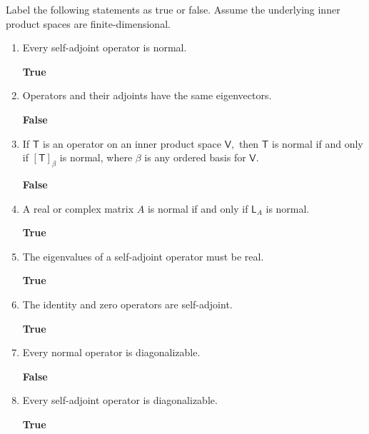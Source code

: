 Label the following statements as true or false. Assume the underlying
inner product spaces are finite-dimensional.
\begin{enumerate}
\item Every self-adjoint operator is normal.

{\bf True}

\item Operators and their adjoints have the same eigenvectors.

{\bf False}

\item If $\mathsf{T}$ is an operator on an inner product space
  $\mathsf{V},$ then $\mathsf{T}$ is normal if and only if
  $[\mathsf{T}]_\beta$ is normal, where $\beta$ is any ordered basis
  for $\mathsf{V}.$

{\bf False}

\item A real or complex matrix $A$ is normal if and only if
  $\mathsf{L}_A$ is normal.

{\bf True}

\item The eigenvalues of a self-adjoint operator must be real.

{\bf True}

\item The identity and zero operators are self-adjoint.

{\bf True}

\item Every normal operator is diagonalizable.

{\bf False}

\item Every self-adjoint operator is diagonalizable. 

{\bf True}
\end{enumerate}

